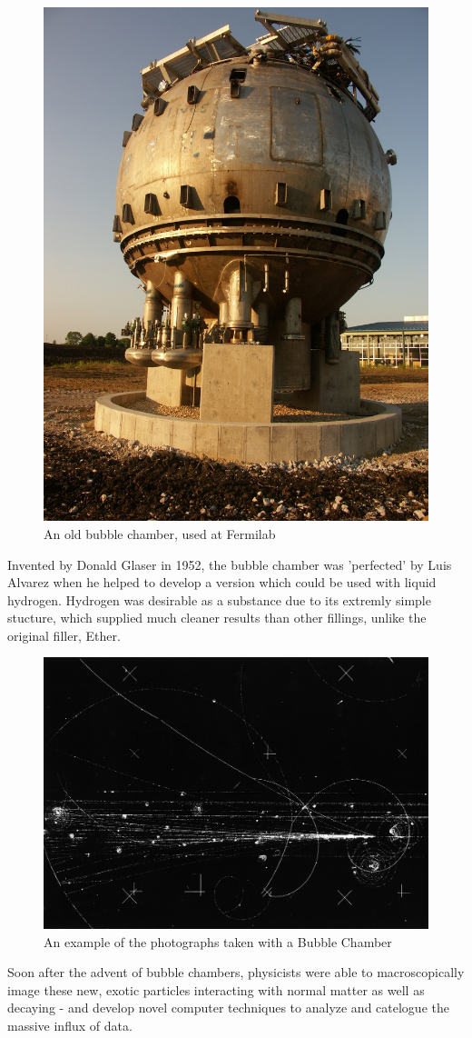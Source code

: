\begin{figure}[ht]
	\centering
	\includegraphics[width=0.5\linewidth]{../Chapter2/fig/bubblechamberfnal.jpg}
	\caption{An old bubble chamber, used at Fermilab}
	\label{fig:bubble_chamber}
\end{figure}

Invented by Donald Glaser in 1952, the bubble chamber was 'perfected' by Luis
Alvarez when he helped to develop a version which could be used with liquid
hydrogen. Hydrogen was desirable as a substance due to its extremly simple
stucture, which supplied much cleaner results than other fillings, unlike the
original filler, Ether.

\begin{figure}[ht]
	\centering
	\includegraphics[width=0.5\linewidth]{../Chapter2/fig/bubble_chamber_tracks.jpg}
	\caption{An example of the photographs taken with a Bubble Chamber}
	\label{fig:bubble_tracks}
\end{figure}

Soon after the advent of bubble chambers, physicists were able to
macroscopically image these new, exotic particles interacting with normal matter
as well as decaying - and develop novel computer techniques to analyze and
catelogue the massive influx of data.

